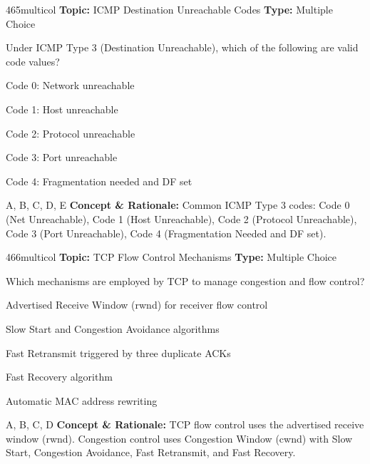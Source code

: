 \begin{qcard}{465}{multicol}
\textcolor{darkslate!75}{\small\textbf{Topic:} ICMP Destination Unreachable Codes \hfill \textbf{Type:} Multiple Choice}\vspace{0.4em}\par
Under ICMP Type 3 (Destination Unreachable), which of the following are valid code values?
\begin{qoptions}
\item Code 0: Network unreachable
\item Code 1: Host unreachable
\item Code 2: Protocol unreachable
\item Code 3: Port unreachable
\item Code 4: Fragmentation needed and DF set
\end{qoptions}
\end{qcard}
\nopagebreak
\begin{explainbox}{A, B, C, D, E}
\textbf{Concept \& Rationale:} Common ICMP Type 3 codes: Code 0 (Net Unreachable), Code 1 (Host Unreachable), Code 2 (Protocol Unreachable), Code 3 (Port Unreachable), Code 4 (Fragmentation Needed and DF set).
\end{explainbox}

\begin{qcard}{466}{multicol}
\textcolor{darkslate!75}{\small\textbf{Topic:} TCP Flow Control Mechanisms \hfill \textbf{Type:} Multiple Choice}\vspace{0.4em}\par
Which mechanisms are employed by TCP to manage congestion and flow control?
\begin{qoptions}
\item Advertised Receive Window (rwnd) for receiver flow control
\item Slow Start and Congestion Avoidance algorithms
\item Fast Retransmit triggered by three duplicate ACKs
\item Fast Recovery algorithm
\item Automatic MAC address rewriting
\end{qoptions}
\end{qcard}
\nopagebreak
\begin{explainbox}{A, B, C, D}
\textbf{Concept \& Rationale:} TCP flow control uses the advertised receive window (rwnd). Congestion control uses Congestion Window (cwnd) with Slow Start, Congestion Avoidance, Fast Retransmit, and Fast Recovery.
\end{explainbox}

